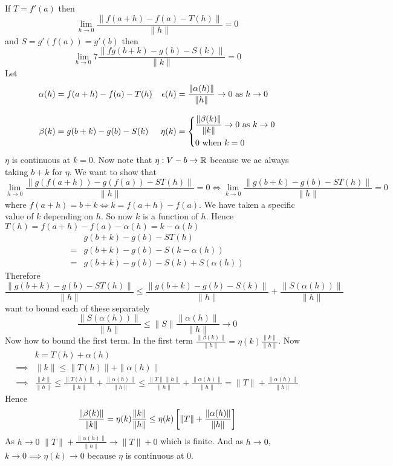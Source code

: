 \begin{myproof}
If $T=f'(a)$ then $$\lim_{h\to 0}\frac{\|f(a+h)-f(a)-T(h)\|}{\|h\|}=0$$and $S=g'(f(a))=g'(b)$ then $$ \lim_{h\to 0}7\frac{\|fg(b+k)-g(b)-S(k)\|}{\|k\|}=0$$Let \begin{align*}
	\alpha(h) & = f(a+h)-f(a)-T(h) & \eps(h)   & = \frac{\|\alpha(h)\|}{\|h\|}\to 0\text{ as }h\to 0\\[3mm]
	\beta(k)  & = g(b+k)-g(b)-S(k) & \eta(k)   & = \begin{cases*}
		\dfrac{\|\beta(k)\|}{\|k\|}\to0  \text{ as }k\to 0 \\
		0      \text{ when }                         k=0
	\end{cases*}
\end{align*}
$\eta$ is continuous at $k=0$. Now note that $\eta:V-b\to \mathbb{R}$ because we ae always taking $b+k$ for $\eta$. We want to show that \[\lim_{h\to 0}\frac{\|g(f(a+h))-g(f(a))-ST(h)\|}{\|h\|}=0\iff \lim_{k\to 0}\frac{\|g(b+k)-g(b)-ST(h)\|}{\|h\|}=0\]where $f(a+h)=b+k\iff k=f(a+h)-f(a)$. We have taken a specific value of $k$ depending on $h$. So now $k$ is a function of $h$. Hence $T(h)=f(a+h)-f(a)-\alpha(h)=k-\alpha(h)$
\begin{align*}
	  & g(b+k) -g(b) -ST(h)           \\
	= & g(b+k) -g(b) -S(k-\alpha(h))  \\
	= & g(b+k)-g(b)-S(k)+S(\alpha(h))
\end{align*}Therefore\[ \frac{\|g(b+k)-g(b)-ST(h)\|}{\|h\|}\leq \frac{\|g(b+k)-g(b)-S(k)\|}{\|h\|}+\frac{\|S(\alpha(h))\|}{\|h\|}\] want to bound each of these separately
\[\frac{\|S(\alpha(h))\|}{\|h\|}\leq \|S\|\frac{\|\alpha(h)\|}{\|h\|}\to 0\]Now how to bound the first term. In the first term $\frac{\|\beta(k)\|}{\|h\|}=\eta(k)\frac{\|k\|}{\|h\|}$. Now \begin{align*}
	         & k=T(h)+\alpha(h)                                                                                                                    \\
	\implies & \|k\|\leq \|T(h)\|+\|\alpha(h)\|                                                                                                    \\
	\implies & \frac{\|k\|}{\|h\|}\leq \frac{\|T(h)\|}{\|h\|}+\frac{\|\alpha(h)\|}{\|h\|}\leq \frac{\|T\|\|h\|}{\|h\|}+\frac{\|\alpha(h)\|}{\|h\|} = \|T\|+\frac{\|\alpha(h)\|}{\|h\|}
\end{align*}Hence $$\frac{\|\beta(k)\|}{\|k\|}=\eta(k)\frac{\|k\|}{\|h\|}\leq \eta(k)\left[\|T\|+\frac{\|\alpha(h)\|}{\|h\|}\right]$$As $h\to 0$ $\|T\|+\frac{\|\alpha(h)\|}{\|h\|}\to \|T\|+0$ which is finite. And as $h\to 0$, $k\to 0\implies \eta(k)\to 0$ because $\eta$ is continuous at 0.
\end{myproof}

